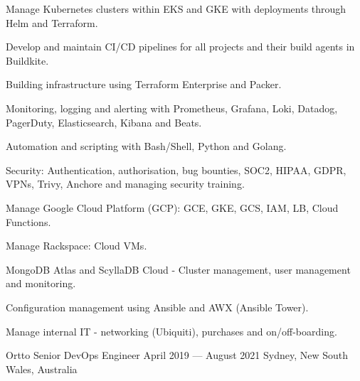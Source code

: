 \begin{cventries}
{\begin{cvitems}
      \item {Manage Kubernetes clusters within EKS and GKE with deployments through Helm and Terraform.}
      \item {Develop and maintain CI/CD pipelines for all projects and their build agents in Buildkite.}
      \item {Building infrastructure using Terraform Enterprise and Packer.}
      \item {Monitoring, logging and alerting with Prometheus, Grafana, Loki, Datadog, PagerDuty, Elasticsearch, Kibana and Beats.}
      \item {Automation and scripting with Bash/Shell, Python and Golang.}
      \item {Security: Authentication, authorisation, bug bounties, SOC2, HIPAA, GDPR, VPNs, Trivy, Anchore and managing security training.}
      \item {Manage Google Cloud Platform (GCP): GCE, GKE, GCS, IAM, LB, Cloud Functions.}
      \item {Manage Rackspace: Cloud VMs.}
      \item {MongoDB Atlas and ScyllaDB Cloud - Cluster management, user management and monitoring.}
      \item {Configuration management using Ansible and AWX (Ansible Tower).}
      \item {Manage internal IT - networking (Ubiquiti), purchases and on/off-boarding.}
    \end{cvitems}
  }

  \cventry
  {Ortto} %
  {Senior DevOps Engineer} %
  {April 2019 --- August 2021} %
  {Sydney, New South Wales, Australia} %
  {} %
  {} %
  {} %


\end{cventries}
